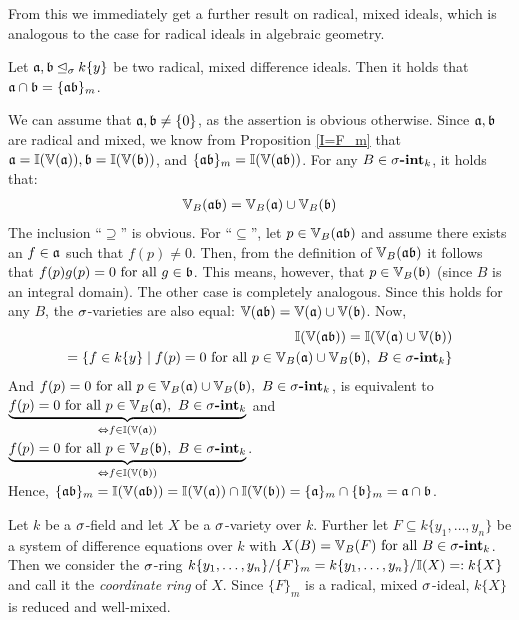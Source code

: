 From this we immediately get a further result on radical, mixed ideals, which is analogous to the case for radical ideals in algebraic geometry.
\begin{cor}\label{prod=cap}
Let $\a, \b \si k\{y\}$ be two radical, mixed difference ideals. Then it holds that $\a \cap \b = \{ \a \b \}_m$.
\begin{bew}
We can assume that $\a, \b \neq \{0\}$, as the assertion is obvious otherwise. Since $\a, \b$ are radical and mixed, we know from Proposition \ref{I=F_m} that $\a = \I(\VV(\a)), \b = \I(\VV(\b))$, and $\{ \a \b \}_m = \I( \VV( \a \b ))$.
For any $B \in \sintk$, it holds that:
\begin{align*} \VV_B( \a \b) = \VV_B( \a) \cup \VV_B( \b) \end{align*}
The inclusion ``$\supseteq$'' is obvious. For ``$\subseteq$'', let $p \in \VV_B(\a\b)$ and assume there exists an $f \in \a$ such that $f(p) \neq 0$.
Then, from the definition of $\VV_B(\a\b)$ it follows that $f(p)g(p) = 0 \fa g \in \b$. This means, however, that $p \in \VV_B(\b)$ (since $B$ is an integral domain). The other case is completely analogous.
Since this holds for any $B$, the $\s$-varieties are also equal: $\VV( \a \b) = \VV( \a) \cup \VV( \b)$. Now,
\begin{align*} \I(\VV(\a \b)) = \I(\VV(\a) \cup \VV(\b)) \\ = \{ f \in k\{y\} \mid f(p) = 0 \fa p \in \VV_B(\a) \cup \VV_B(\b), ~ B \in \sintk \} \end{align*}
And $f(p) = 0 \fa p \in \VV_B(\a) \cup \VV_B(\b), ~ B \in \sintk$, is equivalent to \\
$ \underbrace{f(p) = 0 \fa p \in \VV_B(\a), ~ B \in \sintk}_{\Leftrightarrow f \in \I(\VV(\a))}$ and $ \underbrace{f(p) = 0 \fa p \in \VV_B(\b), ~ B \in \sintk}_{\Leftrightarrow f \in \I(\VV(\b))}$. \\
Hence, $\{\a\b\}_m = \I(\VV( \a \b)) = \I(\VV(\a)) \cap \I(\VV(\b)) = \{\a\}_m \cap \{\b\}_m = \a \cap \b$.
\end{bew}
\end{cor}

\begin{defn}
Let $k$ be a $\s$-field and let $X$ be a $\s$-variety over $k$. Further let $F \subseteq k\{y_1, \ldots, y_n\}$ be a system of difference equations over $k$ with $X(B) = \VV_B(F) \fa B \in \sintk$.
Then we consider the $\s$-ring $k\{y_1, \ldots, y_n\}/\{F\}_m = k\{y_1, \ldots, y_n\}/\I(X) =: k\{X\}$ and call it the \emph{coordinate ring} of $X$. Since $\{F\}_m$ is a radical, mixed $\s$-ideal, $k\{X\}$ is reduced and well-mixed. 
\end{defn}

